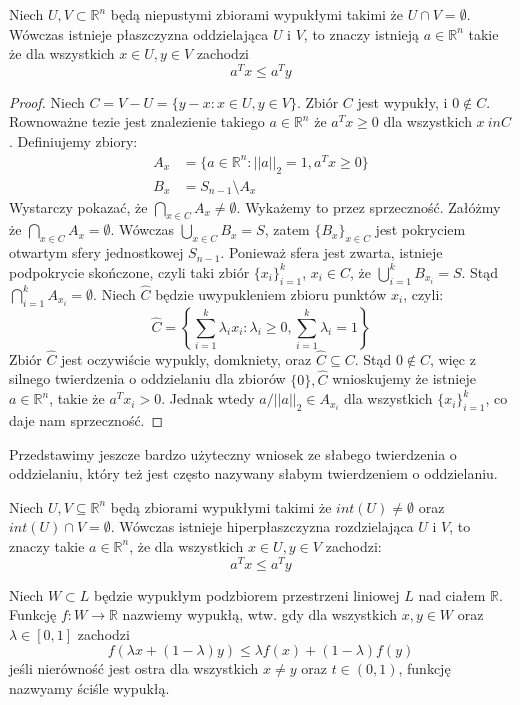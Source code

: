 \documentclass[10pt,a4paper,draft]{report}
\begin{document}
\begin{theorem}
Niech $U,V \subset \mathbb{R}^n$ będą niepustymi zbiorami  wypukłymi takimi że $U \cap V = \emptyset$. Wówczas istnieje płaszczyzna oddzielająca $U$ i $V$, to znaczy istnieją $a \in \mathbb{R}^n$ takie że dla wszystkich $x \in U, y \in V$ zachodzi
\[
a^T x \leq a^T y
\]
\end{theorem}
\begin{proof}
Niech $C = V - U = \{ y - x: x \in U, y \in V \}$. Zbiór $C$ jest wypukły, i $0 \not\in C$. Rownoważne tezie jest znalezienie takiego $a \in \mathbb{R}^n$ że $a^T x \geq 0$ dla wszystkich $x \ in C$. Definiujemy zbiory:
\[
\begin{aligned}
A_x &= \{a \in \mathbb{R}^n : ||a||_2 = 1 , a^T x \geq 0 \} \\
B_x &= S_{n-1} \setminus A_x 
\end{aligned}
\]
Wystarczy pokazać, że $\bigcap_{x \in C} A_x \neq \emptyset$. Wykażemy to przez sprzeczność. Załóżmy że $\bigcap_{x \in C} A_x = \emptyset$. Wówczas $\bigcup_{x \in C} B_x = S$, zatem $\{B_x\}_{x \in C}$ jest pokryciem otwartym sfery jednostkowej $S_{n-1}$. Ponieważ sfera jest zwarta, istnieje podpokrycie skończone, czyli taki zbiór $\{x_i\}_{i=1}^k$, $x_i \in C$, że $\bigcup_{i=1}^k B_{x_i} = S$. Stąd $\bigcap_{i=1}^k A_{x_i} = \emptyset$. Niech $\hat{C}$ będzie uwypukleniem zbioru punktów $x_i$, czyli:
\[
\hat{C} = \left\{ \sum_{i=1}^k \lambda_i x_i : \lambda_i \geq 0, \sum_{i=1}^k \lambda_i = 1\right\} 
\] 
Zbiór $\hat{C}$ jest oczywiście wypukly, domkniety, oraz $\hat{C} \subseteq C$. Stąd $0 \not\in \hat{C}$, więc z silnego twierdzenia o oddzielaniu dla zbiorów $\{0\}, \hat{C}$ wnioskujemy że istnieje $a \in \mathbb{R}^n$, takie że $a^T x_i > 0$. Jednak wtedy $a / ||a||_2 \in A_{x_i}$ dla wszystkich $\{x_i\}_{i=1}^k$, co daje nam sprzeczność.
\end{proof}

Przedstawimy jeszcze bardzo użyteczny wniosek ze słabego twierdzenia o oddzielaniu, który też jest często nazywany słabym twierdzeniem o oddzielaniu.
\begin{corollary}
Niech $U,V \subseteq \mathbb{R}^n$ będą zbiorami wypukłymi takimi że $int(U) \neq \emptyset$ oraz $int(U) \cap V = \emptyset$. Wówczas istnieje hiperpłaszczyzna rozdzielająca $U$ i $V$, to znaczy takie $a \in \mathbb{R}^n$, że dla wszystkich $x \in U, y \in V$ zachodzi:
\[
a^T x \leq a^T y
\]
\end{corollary}

\begin{definition} 
Niech $W \subset L$ będzie wypukłym podzbiorem przestrzeni liniowej $L$ nad ciałem $\mathbb{R}$. Funkcję $f : W \rightarrow \mathbb{R}$ nazwiemy wypukłą, wtw. gdy dla wszystkich $x,y \in W$ oraz $\lambda \in [0,1]$ zachodzi
\[
f(\lambda x + (1-\lambda)y ) \leq \lambda f(x) + (1 - \lambda) f(y)
\]
jeśli nierówność jest ostra dla wszystkich $x \neq y$ oraz $t \in (0,1)$, funkcję nazwyamy ściśle wypukłą.
\end{definition}
\end{document}
